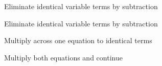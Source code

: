 \documentclass[12pt, a4paper, addpoints]{exam}
\newcommand{\elimination}[6]{%
    \pgfmathsetmacro{\cval}{#3*#1 + #5*#2} %
    \pgfmathsetmacro{\pval}{#4*#1 + #6*#2} %

    \def\formata{%
        \ifnum#3=1
            x
        \else\ifnum#3=-1
            -x
        \else
            \pgfmathprintnumber{#3}x
        \fi\fi}

    \def\formatb{%
        \ifnum#5=1
            +y
        \else\ifnum#5=-1
            -y
        \else
            \ifnum#5<0 \pgfmathprintnumber{#5}y \else +\pgfmathprintnumber{#5}y \fi
        \fi\fi}

    \def\formatd{%
        \ifnum#4=1
            x
        \else\ifnum#4=-1
            -x
        \else
            \pgfmathprintnumber{#4}x
        \fi\fi}

    \def\formate{%
        \ifnum#6=1
            +y
        \else\ifnum#6=-1
            -y
        \else
            \ifnum#6<0 \pgfmathprintnumber{#6}y \else +\pgfmathprintnumber{#6}y \fi
        \fi\fi}

    \[
    \begin{aligned}
    \formata \formatb &= \pgfmathprintnumber{\cval} \\[-1pt]
    \formatd \formate &= \pgfmathprintnumber{\pval}
    \end{aligned}
    \]
}
\newcommand{\bs}{\vspace{65mm}}
\newcommand{\verticalspace}{\vspace{51mm}}
\begin{document}
\LARGE
\begin{questions}
\question Eliminate  identical variable terms
 by subtraction
\begin{multicols}{2} %

\end{multicols}
\bs
\question Eliminate  identical  variable terms  by subtraction
\begin{multicols}{2} %
\end{multicols}
\newpage
 \renewcommand{\verticalspace}{\vspace{71mm}}
\bs
\question Multiply across one equation to identical terms 
\begin{multicols}{2} %
\end{multicols}
\bs
\question Multiply both equations and continue
\begin{multicols}{2} %
\begin{parts}


\end{parts}
\end{multicols}
\end{questions}
\end{document}
